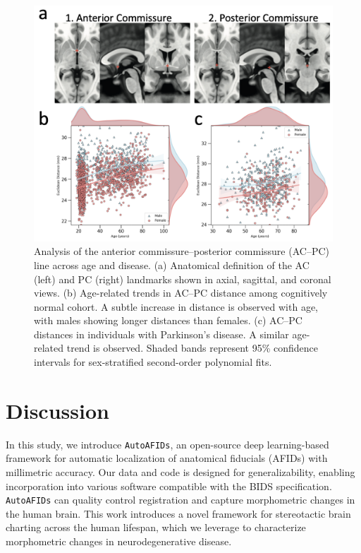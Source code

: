 \begin{figure}[hbt!]
    \centering
    \includegraphics[width=1\linewidth]{figs/ch3_Figure_acpc.png}
    \caption{
    Analysis of the anterior commissure–posterior commissure (AC–PC) line across age and disease. (a) Anatomical definition of the AC (left) and PC (right) landmarks shown in axial, sagittal, and coronal views. (b) Age-related trends in AC–PC distance among cognitively normal cohort. A subtle increase in distance is observed with age, with males showing longer distances than females. (c) AC–PC distances in individuals with Parkinson’s disease. A similar age-related trend is observed. Shaded bands represent 95\% confidence intervals for sex-stratified second-order polynomial fits.
    }
    \label{fig:ch3_Figure_acpc}
\end{figure}

\section{Discussion}
In this study, we introduce \texttt{AutoAFIDs}, an open-source deep learning-based framework for automatic localization of anatomical fiducials (AFIDs) with millimetric accuracy. Our data and code is designed for generalizability, enabling incorporation into various software compatible with the BIDS specification. \texttt{AutoAFIDs} can quality control registration and capture morphometric changes in the human brain. This work introduces a novel framework for stereotactic brain charting across the human lifespan, which we leverage to characterize morphometric changes in neurodegenerative disease.

